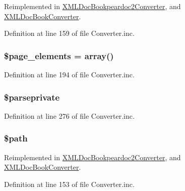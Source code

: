 \-Reimplemented in \hyperlink{class_x_m_l_doc_bookpeardoc2_converter_a22fa57ada47299e1b00ca90f550a1194}{\-X\-M\-L\-Doc\-Bookpeardoc2\-Converter}, and \hyperlink{class_x_m_l_doc_book_converter_a22fa57ada47299e1b00ca90f550a1194}{\-X\-M\-L\-Doc\-Book\-Converter}.



\-Definition at line 159 of file \-Converter.\-inc.

\hypertarget{class_converter_a5dc95f781b9a381af6fb199035074f47}{
\subsubsection[{\$page\-\_\-elements}]{\setlength{\rightskip}{0pt plus 5cm}\$page\-\_\-elements = array()}}\label{class_converter_a5dc95f781b9a381af6fb199035074f47}


\-Definition at line 194 of file \-Converter.\-inc.

\hypertarget{class_converter_a8de99eed8da296ff730545219e284e78}{
\subsubsection[{\$parseprivate}]{\setlength{\rightskip}{0pt plus 5cm}\$parseprivate}}\label{class_converter_a8de99eed8da296ff730545219e284e78}


\-Definition at line 276 of file \-Converter.\-inc.

\hypertarget{class_converter_a0a4baf0b22973c07685c3981f0d17fc4}{
\subsubsection[{\$path}]{\setlength{\rightskip}{0pt plus 5cm}\$path}}\label{class_converter_a0a4baf0b22973c07685c3981f0d17fc4}


\-Reimplemented in \hyperlink{class_x_m_l_doc_bookpeardoc2_converter_a0a4baf0b22973c07685c3981f0d17fc4}{\-X\-M\-L\-Doc\-Bookpeardoc2\-Converter}, and \hyperlink{class_x_m_l_doc_book_converter_a0a4baf0b22973c07685c3981f0d17fc4}{\-X\-M\-L\-Doc\-Book\-Converter}.



\-Definition at line 153 of file \-Converter.\-inc.

